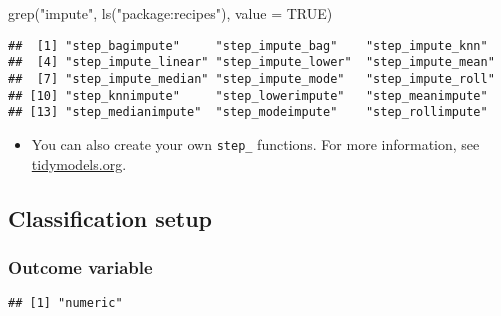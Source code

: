 \documentclass[
]{book}
\newenvironment{Shaded}{\begin{snugshade}}{\end{snugshade}}
\newcommand{\AttributeTok}[1]{\textcolor[rgb]{0.77,0.63,0.00}{#1}}
\newcommand{\ConstantTok}[1]{\textcolor[rgb]{0.00,0.00,0.00}{#1}}
\newcommand{\FunctionTok}[1]{\textcolor[rgb]{0.00,0.00,0.00}{#1}}
\newcommand{\NormalTok}[1]{#1}
\newcommand{\OtherTok}[1]{\textcolor[rgb]{0.56,0.35,0.01}{#1}}
\newcommand{\SpecialCharTok}[1]{\textcolor[rgb]{0.00,0.00,0.00}{#1}}
\newcommand{\StringTok}[1]{\textcolor[rgb]{0.31,0.60,0.02}{#1}}
\providecommand{\tightlist}{%
  \setlength{\itemsep}{0pt}\setlength{\parskip}{0pt}}
\begin{document}
\begin{Shaded}
\begin{Highlighting}[]
\FunctionTok{grep}\NormalTok{(}\StringTok{"impute"}\NormalTok{, }\FunctionTok{ls}\NormalTok{(}\StringTok{"package:recipes"}\NormalTok{), }\AttributeTok{value =} \ConstantTok{TRUE}\NormalTok{)}
\end{Highlighting}
\end{Shaded}

\begin{verbatim}
##  [1] "step_bagimpute"     "step_impute_bag"    "step_impute_knn"   
##  [4] "step_impute_linear" "step_impute_lower"  "step_impute_mean"  
##  [7] "step_impute_median" "step_impute_mode"   "step_impute_roll"  
## [10] "step_knnimpute"     "step_lowerimpute"   "step_meanimpute"   
## [13] "step_medianimpute"  "step_modeimpute"    "step_rollimpute"
\end{verbatim}

\begin{itemize}
\tightlist
\item
  You can also create your own \texttt{step\_} functions. For more information, see \href{https://www.tidymodels.org/learn/develop/recipes/}{tidymodels.org}.
\end{itemize}

\hypertarget{classification-setup}{%
\subsection{Classification setup}\label{classification-setup}}

\hypertarget{outcome-variable-1}{%
\subsubsection{Outcome variable}\label{outcome-variable-1}}

\begin{Shaded}
\end{Shaded}

\begin{verbatim}
## [1] "numeric"
\end{verbatim}

\begin{Shaded}
\end{Shaded}
\end{document}
